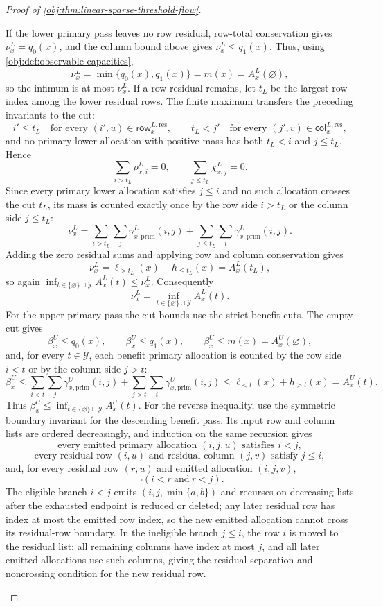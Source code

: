 \documentclass[11pt]{article}
\begin{document}
\begin{proof}[Proof of \cref{obj:thm:linear-sparse-threshold-flow}]
\begin{enumerate}
If the lower primary pass leaves no row residual, row-total conservation gives \(\nu_x^L=q_0(x)\), and the column bound above gives \(\nu_x^L\le q_1(x)\).  Thus, using \cref{obj:def:observable-capacities},
\[
\nu_x^L=\min\{q_0(x),q_1(x)\}=m(x)=A_x^L(\varnothing),
\]
so the infimum is at most \(\nu_x^L\).  If a row residual remains, let \(t_L\) be the largest row index among the lower residual rows.  The finite maximum transfers the preceding invariants to the cut:
\[
i'\le t_L\quad\text{for every }(i',u)\in\mathsf{row}_{x}^{L,\mathrm{res}},
\qquad
t_L<j'\quad\text{for every }(j',v)\in\mathsf{col}_{x}^{L,\mathrm{res}},
\]
and no primary lower allocation with positive mass has both \(t_L<i\) and \(j\le t_L\).  Hence
\[
\sum_{i>t_L}\rho_{x,i}^L=0,
\qquad
\sum_{j\le t_L}\chi_{x,j}^L=0.
\]
Since every primary lower allocation satisfies \(j\le i\) and no such allocation crosses the cut \(t_L\), its mass is counted exactly once by the row side \(i>t_L\) or the column side \(j\le t_L\):
\[
\nu_x^L
=
\sum_{i>t_L}\sum_j\gamma_{x,\mathrm{prim}}^L(i,j)
+
\sum_{j\le t_L}\sum_i\gamma_{x,\mathrm{prim}}^L(i,j).
\]
Adding the zero residual sums and applying row and column conservation gives
\[
\nu_x^L
=
\ell_{>t_L}(x)+h_{\le t_L}(x)
=A_x^L(t_L),
\]
so again \(\inf_{t\in\{\varnothing\}\cup\mathcal Y}A_x^L(t)\le \nu_x^L\).  Consequently
\[
\nu_x^L
=
\inf_{t\in\{\varnothing\}\cup\mathcal Y} A_x^L(t).
\]
For the upper primary pass the cut bounds use the strict-benefit cuts.  The empty cut gives
\[
\beta_x^U\le q_0(x),
\qquad
\beta_x^U\le q_1(x),
\qquad
\beta_x^U\le m(x)=A_x^U(\varnothing),
\]
and, for every \(t\in\mathcal Y\), each benefit primary allocation is counted by the row side \(i<t\) or by the column side \(j>t\):
\[
\beta_x^U
\le
\sum_{i<t}\sum_j\gamma_{x,\mathrm{prim}}^U(i,j)
+
\sum_{j>t}\sum_i\gamma_{x,\mathrm{prim}}^U(i,j)
\le
\ell_{<t}(x)+h_{>t}(x)
=A_x^U(t).
\]
Thus \(\beta_x^U\le\inf_{t\in\{\varnothing\}\cup\mathcal Y}A_x^U(t)\).  For the reverse inequality, use the symmetric boundary invariant for the descending benefit pass.  Its input row and column lists are ordered decreasingly, and induction on the same recursion gives
\[
\text{every emitted primary allocation }(i,j,u)\text{ satisfies }i<j,
\]
\[
\text{every residual row }(i,u)\text{ and residual column }(j,v)\text{ satisfy }j\le i,
\]
and, for every residual row \((r,u)\) and emitted allocation \((i,j,v)\),
\[
\neg(i<r\ \text{and}\ r<j).
\]
The eligible branch \(i<j\) emits \((i,j,\min\{a,b\})\) and recurses on decreasing lists after the exhausted endpoint is reduced or deleted; any later residual row has index at most the emitted row index, so the new emitted allocation cannot cross its residual-row boundary.  In the ineligible branch \(j\le i\), the row \(i\) is moved to the residual list; all remaining columns have index at most \(j\), and all later emitted allocations use such columns, giving the residual separation and noncrossing condition for the new residual row.


\end{enumerate}
\end{proof}
\end{document}
